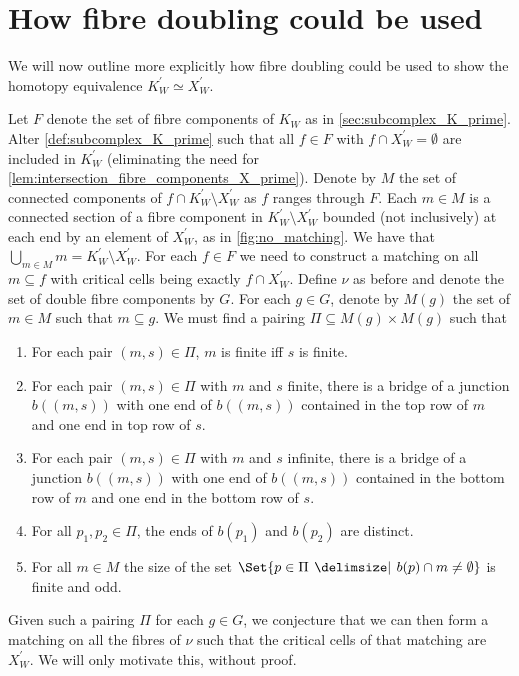 \documentclass[class=article, crop=false]{standalone}
\begin{document}
\section{How fibre doubling could be used}

We will now outline more explicitly how fibre doubling could be used to show the homotopy equivalence $K^\prime_W \simeq X^\prime_W$.

Let $F$ denote the set of fibre components of $K_W$ as in \cref{sec:subcomplex_K_prime}. Alter \cref{def:subcomplex_K_prime} such that all $f \in F$ with $f \cap X^\prime_W = \emptyset$ are included in $K^\prime_W$ (eliminating the need for \cref{lem:intersection_fibre_components_X_prime}). Denote by $M$ the set of connected components of $f \cap K^\prime_W \setminus X^\prime_W$ as $f$ ranges through $F$. Each $m \in M$ is a connected section of a fibre component in $K^\prime_W \setminus X^\prime_W$ bounded (not inclusively) at each end by an element of $X^\prime_W$, as in \cref{fig:no_matching}. We have that $\bigcup_{m \in M}m = K^\prime_W \setminus X^\prime_W$.
For each $f \in F$ we need to construct a matching on all $m \subseteq f$ with critical cells being exactly $f \cap X^\prime_W$. Define $\nu$ as before and denote the set of double fibre components by $G$. For each $g \in G$, denote by $M(g)$ the set of $m \in M$ such that $m \subseteq g$. We must find a pairing $\Pi \subseteq M(g)\times M(g)$ such that
\begin{enumerate}
    \item For each pair $(m,s) \in \Pi$, $m$ is finite iff $s$ is finite.
    \item For each pair $(m,s) \in \Pi$ with $m$ and $s$ finite, there is a bridge of a junction $b((m,s))$ with one end of $b((m,s))$ contained in the top row of $m$ and one end in top row of $s$.
    \item For each pair $(m,s) \in \Pi$ with $m$ and $s$ infinite, there is a bridge of a junction $b((m,s))$ with one end of $b((m,s))$ contained in the bottom row of $m$ and one end in the bottom row of $s$.
    \item For all $p_1,p_2 \in \Pi$, the ends of $b(p_1)$ and $b(p_2)$ are distinct.
    \item For all $m \in M$ the size of the set $\Set{p \in \Pi \given b(p) \cap m \neq \emptyset}$ is finite and odd.  
\end{enumerate}
Given such a pairing $\Pi$ for each $g \in G$, we conjecture that we can then form a matching on all the fibres of $\nu$ such that the critical cells of that matching are $X^\prime_W$. We will only motivate this, without proof.
\end{document}

